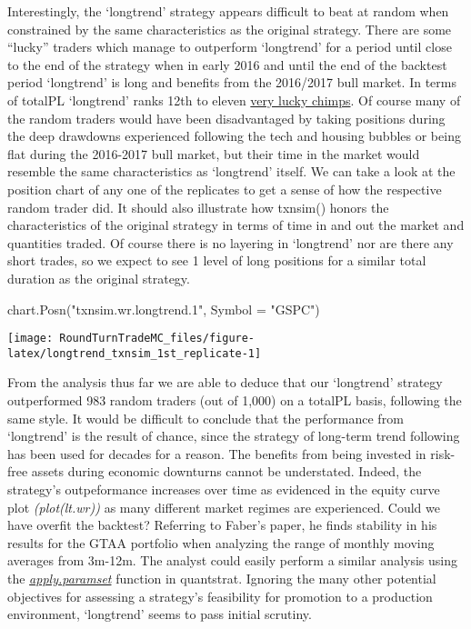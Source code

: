 Interestingly, the `longtrend' strategy appears difficult to beat at
random when constrained by the same characteristics as the original
strategy. There are some ``lucky'' traders which manage to outperform
`longtrend' for a period until close to the end of the strategy when in
early 2016 and until the end of the backtest period `longtrend' is long
and benefits from the 2016/2017 bull market. In terms of totalPL
`longtrend' ranks 12th to eleven
\href{http://www.followingthetrend.com/2016/04/you-cant-beat-all-the-chimps/}{very
lucky chimps}. Of course many of the random traders would have been
disadvantaged by taking positions during the deep drawdowns experienced
following the tech and housing bubbles or being flat during the
2016-2017 bull market, but their time in the market would resemble the
same characteristics as `longtrend' itself. We can take a look at the
position chart of any one of the replicates to get a sense of how the
respective random trader did. It should also illustrate how txnsim()
honors the characteristics of the original strategy in terms of time in
and out the market and quantities traded. Of course there is no layering
in `longtrend' nor are there any short trades, so we expect to see 1
level of long positions for a similar total duration as the original
strategy.

\begin{Schunk}
\begin{Sinput}
chart.Posn("txnsim.wr.longtrend.1", Symbol = "GSPC")
\end{Sinput}


\begin{center}\texttt{[image: RoundTurnTradeMC\_files/figure-latex/longtrend\_txnsim\_1st\_replicate-1]} \end{center}

\end{Schunk}

From the analysis thus far we are able to deduce that our `longtrend'
strategy outperformed 983 random traders (out of 1,000) on a totalPL
basis, following the same style. It would be difficult to conclude that
the performance from `longtrend' is the result of chance, since the
strategy of long-term trend following has been used for decades for a
reason. The benefits from being invested in risk-free assets during
economic downturns cannot be understated. Indeed, the strategy's
outpeformance increases over time as evidenced in the equity curve plot
\emph{(plot(lt.wr))} as many different market regimes are experienced.
Could we have overfit the backtest? Referring to Faber's paper, he finds
stability in his results for the GTAA portfolio when analyzing the range
of monthly moving averages from 3m-12m. The analyst could easily perform
a similar analysis using the
\href{https://github.com/braverock/quantstrat/blob/master/R/paramsets.R}{\emph{apply.paramset}}
function in quantstrat. Ignoring the many other potential objectives for
assessing a strategy's feasibility for promotion to a production
environment, `longtrend' seems to pass initial scrutiny.

